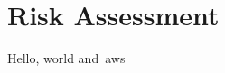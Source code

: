 
\thispagestyle{plain}
\newpage
\section{Risk Assessment}\label{sec:risk-assessment}

\normalsize
Hello, world and~\gls{aws} ~\citep{cc_overview}